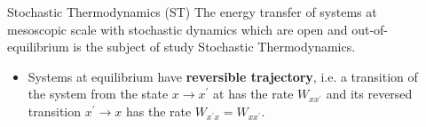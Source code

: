 \documentclass[final]{beamer}
\newlength{\sepwidth}
\newlength{\colwidth}
\newcommand{\separatorcolumn}{\begin{column}{\sepwidth}\end{column}}
\begin{document}
\begin{frame}[t]
\begin{columns}[t]
\separatorcolumn

\begin{column}{\colwidth}


\begin{block}{Stochastic Thermodynamics (ST)}
\vskip10pt
%
%
%
The energy transfer of systems at mesoscopic scale with stochastic dynamics which are open and out-of-equilibrium is the subject of study Stochastic Thermodynamics\cite{peliti2021stochastic,Falasco:2023aa}. 
%
\begin{itemize}
\item Systems at equilibrium have {\bf reversible trajectory}, i.e. a transition of the system from the state $x \rightarrow x^\prime$ at has the rate $W_{xx^\prime}$ and its reversed transition $x^\prime \rightarrow x$ has the rate $W_{x^\prime x}=W_{xx^\prime}$.


\end{itemize}
\end{block}
\end{column}
\end{columns}
\end{frame}
\end{document}
